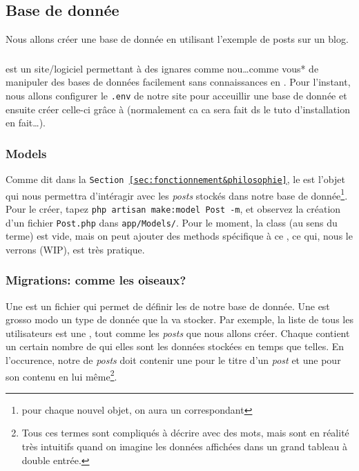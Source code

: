 \documentclass[internal]{nhitec_design}
\begin{document}
\newpage

\subsection{Base de donnée}
Nous allons créer une base de donnée en utilisant l'exemple de posts sur un blog.


\subsubsection[PHPMyAdmin][]{\phpmyadmin{}}
\phpmyadmin{} est un site/logiciel permettant à des ignares comme nou\ldots comme vous* de manipuler des bases de données facilement sans connaissances en \mysql. Pour l'instant, nous allons configurer le \verb|.env| de notre site pour acceuillir une base de donnée et ensuite créer celle-ci grâce à \phpmyadmin{} (normalement ca ca sera fait ds le tuto d'installation en fait\ldots).

\subsubsection[Models][laravel.com/docs/10.x/eloquent\#generating-model-classes]{Models}
Comme dit dans la \texttt{Section~\ref{sec:fonctionnement&philosophie}}, le \model{} est l'objet qui nous permettra d'intéragir avec les \textit{posts} stockés dans notre base de donnée\footnote{pour chaque nouvel objet, on aura un \model{} correspondant}. Pour le créer, tapez \verb|php artisan make:model Post -m|, et observez la création d'un fichier \verb|Post.php| dans \verb|app/Models/|. Pour le moment, la class (au sens \php{} du terme) est vide, mais on peut ajouter des methods spécifique à ce \model{}, ce qui, nous le verrons (WIP), est très pratique.

\subsubsection[Migrations][laravel.com/docs/10.x/migrations\#introduction]{Migrations: comme les oiseaux?}

Une \migration{} est un fichier qui permet de définir les \tables{} de notre base de donnée. Une \table{} est grosso modo un type de donnée que la \db{} va stocker. Par exemple, la liste de tous les utilisateurs est une \table{}, tout comme les \textit{posts} que nous allons créer. Chaque \table{} contient un certain nombre de \columns{} qui elles sont les données stockées en temps que telles. En l'occurence, notre \table{} de \textit{posts} doit contenir une \column{} pour le titre d'un \textit{post} et une pour son contenu en lui même\footnote{Tous ces termes sont compliqués à décrire avec des mots, mais sont en réalité très intuitifs quand on imagine les données affichées dans un grand tableau à double entrée.}.
\end{document}
